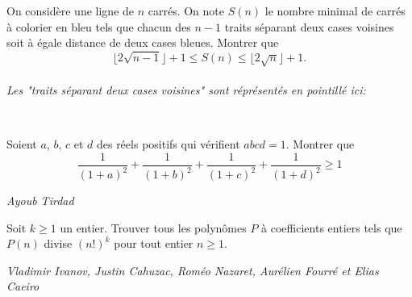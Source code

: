 \begin{exo}{}On considère une ligne de $n$ carrés. On note $S(n)$ le nombre minimal de carrés à colorier en bleu
tels que chacun des $n-1$ traits séparant deux cases voisines soit à égale distance de deux cases
bleues. Montrer que
$$ \lfloor 2 \sqrt {n-1} \rfloor+1 \leq S(n) \leq  \lfloor 2 \sqrt {n} \rfloor +1.$$
~~\\
\textit{Les "traits séparant deux cases voisines" sont réprésentés en pointillé ici:  }
\\

\end{exo}


\begin{exo}{}
Soient $a$, $b$, $c$ et $d$ des réels positifs qui vérifient  $abcd=1$. Montrer que
$$ \dfrac{1}{(1+a)^2}  + \dfrac{1}{(1+b)^2}  + \dfrac{1}{(1+c)^2}  + \dfrac{1}{(1+d)^2} \geq 1$$

\medskip
\textit{Ayoub Tirdad}
\end{exo}

\begin{exo}{}Soit $k \geq 1$ un entier. Trouver tous les polynômes $P$ à coefficients entiers tels que $P(n)$ divise $(n!)^{k}$ pour tout entier $n \geq 1$.

\medskip
\textit{Vladimir Ivanov, Justin Cahuzac, Roméo Nazaret, Aurélien Fourré et Elias Caeiro}
\end{exo}




